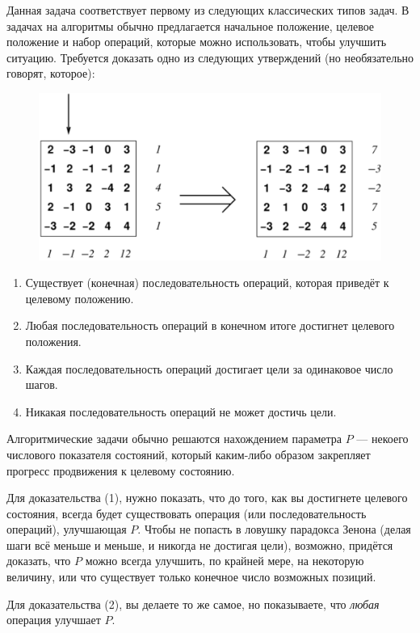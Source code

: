 Данная задача соответствует первому из следующих классических типов задач.
В задачах на алгоритмы обычно предлагается начальное положение, целевое положение и набор операций, которые можно использовать, чтобы улучшить ситуацию.
Требуется доказать одно из следующих утверждений (но необязательно говорят, которое):
\begin{figure}
\centering
\includegraphics[scale=0.6]{Figs/Algorithms/array}
\end{figure}
\begin{enumerate}[(1)]
\item Существует (конечная) последовательность операций, которая приведёт к целевому положению.
\item Любая последовательность операций в конечном итоге достигнет целевого положения.
\item Каждая последовательность операций достигает цели за одинаковое число шагов.
\item Никакая последовательность операций не может достичь цели.
\end{enumerate}

Алгоритмические задачи обычно решаются нахождением параметра $P$ --- некоего числового показателя состояний, который каким-либо образом закрепляет прогресс продвижения к целевому состоянию.

Для доказательства (1), нужно показать, что до того, как вы достигнете целевого состояния, всегда будет существовать операция (или последовательность операций), улучшающая $P$.
Чтобы не попасть в ловушку парадокса Зенона (делая шаги всё меньше и меньше, и никогда не достигая цели), возможно, придётся доказать, что $P$ можно всегда улучшить, по крайней мере, на некоторую величину, или что существует только конечное число возможных позиций.

Для доказательства (2), вы делаете то же самое, но показываете, что \emph{любая} операция улучшает $P$.


